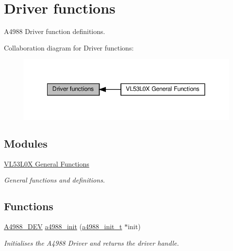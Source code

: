 \hypertarget{group__A4988}{}\section{Driver functions}
\label{group__A4988}


A4988 Driver function definitions.  


Collaboration diagram for Driver functions\+:\nopagebreak
\begin{figure}[H]
\begin{center}
\leavevmode
\includegraphics[width=341pt]{group__A4988}
\end{center}
\end{figure}
\subsection*{Modules}
\begin{DoxyCompactItemize}
\item 
\hyperlink{group__VL53L0X__general__group}{V\+L53\+L0\+X General Functions}
\begin{DoxyCompactList}\small\item\em General functions and definitions. \end{DoxyCompactList}\end{DoxyCompactItemize}
\subsection*{Functions}
\begin{DoxyCompactItemize}
\item 
\hyperlink{structA4988__Driver}{A4988\+\_\+\+D\+EV} \hyperlink{group__A4988_ga169b52420965fa29fa24319c932234e0}{a4988\+\_\+init} (\hyperlink{structA4988__Init}{a4988\+\_\+init\+\_\+t} $\ast$init)
\begin{DoxyCompactList}\small\item\em Initialises the A4988 Driver and returns the driver handle. \end{DoxyCompactList}\end{DoxyCompactItemize}



